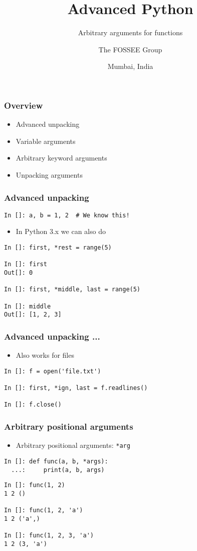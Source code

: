 \documentclass[14pt,compress,aspectratio=169]{beamer}
\title[*args, **kw]{Advanced Python}
\subtitle{Arbitrary arguments for functions}
\author[FOSSEE] {The FOSSEE Group}
\institute[IIT Bombay] {Department of Aerospace Engineering\\IIT Bombay}
\date[] {Mumbai, India}
\begin{document}
\begin{frame}
  \titlepage
\end{frame}

\begin{frame}
  \frametitle{Overview}
  \begin{itemize}
  \item Advanced unpacking
  \item Variable arguments
  \item Arbitrary keyword arguments
  \item Unpacking arguments
  \end{itemize}
\end{frame}

\begin{frame}[fragile]
  \frametitle{Advanced unpacking}
  \vspace*{-0.1in}
\begin{lstlisting}
In []: a, b = 1, 2  # We know this!
\end{lstlisting}
  \pause
  \begin{itemize}
  \item In Python 3.x we can also do
  \end{itemize}
\begin{lstlisting}
In []: first, *rest = range(5)

In []: first
Out[]: 0

In []: first, *middle, last = range(5)

In []: middle
Out[]: [1, 2, 3]
\end{lstlisting}
\end{frame}

\begin{frame}[fragile]
  \frametitle{Advanced unpacking ...}
  \begin{itemize}
    \item Also works for files
  \end{itemize}
\begin{lstlisting}
In []: f = open('file.txt')

In []: first, *ign, last = f.readlines()

In []: f.close()
\end{lstlisting}
\end{frame}

\begin{frame}[fragile]
  \frametitle{Arbitrary positional arguments}
  \vspace*{-0.1in}
  \begin{itemize}
  \item Arbitrary positional arguments: \lstinline{*arg}
  \end{itemize}

\begin{lstlisting}
In []: def func(a, b, *args):
  ...:     print(a, b, args)
\end{lstlisting}
\pause
\begin{lstlisting}
In []: func(1, 2)
1 2 ()

In []: func(1, 2, 'a')
1 2 ('a',)

In []: func(1, 2, 3, 'a')
1 2 (3, 'a')
\end{lstlisting}

\end{frame}
\end{document}
